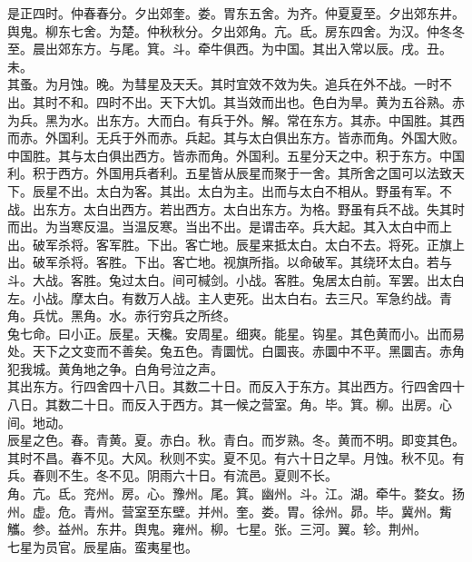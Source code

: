 \documentclass{zhvt-classic}
\begin{document}
\hspace*{2em}是正四时。仲春春分。夕出郊奎。娄。胃东五舍。为齐。仲夏夏至。夕出郊东井。舆鬼。柳东七舍。为楚。仲秋秋分。夕出郊角。亢。氐。房东四舍。为汉。仲冬冬至。晨出郊东方。与尾。箕。斗。牵牛俱西。为中国。其出入常以辰。戌。丑。未。\\
\hspace*{2em}其蚤。为月蚀。晚。为彗星及天夭。其时宜效不效为失。追兵在外不战。一时不出。其时不和。四时不出。天下大饥。其当效而出也。色白为旱。黄为五谷熟。赤为兵。黑为水。出东方。大而白。有兵于外。解。常在东方。其赤。中国胜。其西而赤。外国利。无兵于外而赤。兵起。其与太白俱出东方。皆赤而角。外国大败。中国胜。其与太白俱出西方。皆赤而角。外国利。五星分天之中。积于东方。中国利。积于西方。外国用兵者利。五星皆从辰星而聚于一舍。其所舍之国可以法致天下。辰星不出。太白为客。其出。太白为主。出而与太白不相从。野虽有军。不战。出东方。太白出西方。若出西方。太白出东方。为格。野虽有兵不战。失其时而出。为当寒反温。当温反寒。当出不出。是谓击卒。兵大起。其入太白中而上出。破军杀将。客军胜。下出。客亡地。辰星来抵太白。太白不去。将死。正旗上出。破军杀将。客胜。下出。客亡地。视旗所指。以命破军。其绕环太白。若与斗。大战。客胜。兔过太白。间可椷剑。小战。客胜。兔居太白前。军罢。出太白左。小战。摩太白。有数万人战。主人吏死。出太白右。去三尺。军急约战。青角。兵忧。黑角。水。赤行穷兵之所终。\\
\hspace*{2em}兔七命。曰小正。辰星。天欃。安周星。细爽。能星。钩星。其色黄而小。出而易处。天下之文变而不善矣。兔五色。青圜忧。白圜丧。赤圜中不平。黑圜吉。赤角犯我城。黄角地之争。白角号泣之声。\\
\hspace*{2em}其出东方。行四舍四十八日。其数二十日。而反入于东方。其出西方。行四舍四十八日。其数二十日。而反入于西方。其一候之营室。角。毕。箕。柳。出房。心间。地动。\\
\hspace*{2em}辰星之色。春。青黄。夏。赤白。秋。青白。而岁熟。冬。黄而不明。即变其色。其时不昌。春不见。大风。秋则不实。夏不见。有六十日之旱。月蚀。秋不见。有兵。春则不生。冬不见。阴雨六十日。有流邑。夏则不长。\\
\hspace*{2em}角。亢。氐。兖州。房。心。豫州。尾。箕。幽州。斗。江。湖。牵牛。婺女。扬州。虚。危。青州。营室至东壁。并州。奎。娄。胃。徐州。昴。毕。冀州。觜觿。参。益州。东井。舆鬼。雍州。柳。七星。张。三河。翼。轸。荆州。\\
\hspace*{2em}七星为员官。辰星庙。蛮夷星也。\\
\end{document}
